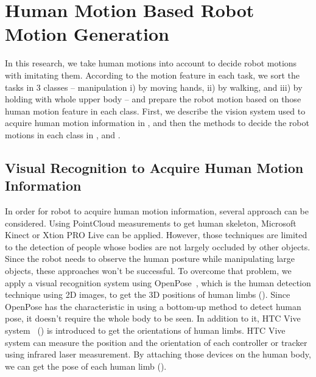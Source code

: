 \section{Human Motion Based Robot Motion Generation}
\label{sec:motion_generator}
In this research, we take human motions into account to decide robot motions with imitating them. According to the motion feature in each task, we sort the tasks in 3 classes -- manipulation i) by moving hands, ii) by walking, and iii) by holding with whole upper body -- and prepare the robot motion based on those human motion feature in each class. First, we describe the vision system used to acquire human motion information in , and then the methods to decide the robot motions in each class in ,  and .

\subsection{Visual Recognition to Acquire Human Motion Information}
\label{subsec:vision}
In order for robot to acquire human motion information, several approach can be considered. Using PointCloud measurements to get human skeleton, Microsoft Kinect or Xtion PRO Live can be applied. However, those techniques are limited to the detection of people whose bodies are not largely occluded by other objects. Since the robot needs to observe the human posture while manipulating large objects, these approaches won't be successful. To overcome that problem, we apply a visual recognition system using OpenPose~\cite{OpenPose}, which is the human detection technique using 2D images, to get the 3D positions of human limbs (). Since OpenPose has the characteristic in using a bottom-up method to detect human pose, it doesn't require the whole body to be seen.  In addition to it, HTC Vive system~\cite{vive} () is introduced to get the orientations of human limbs. HTC Vive system can measure the position and the orientation of each controller or tracker using infrared laser measurement. By attaching those devices on the human body, we can get the pose of each human limb ().

